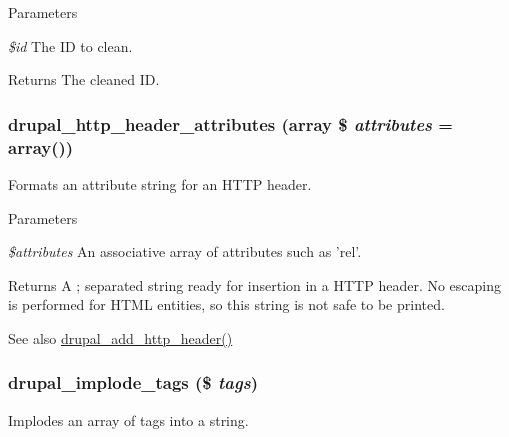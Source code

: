 \begin{DoxyParams}{Parameters}
\item[{\em \$id}]The ID to clean.\end{DoxyParams}
\begin{DoxyReturn}{Returns}
The cleaned ID. 
\end{DoxyReturn}
\hypertarget{common_8inc_a70f1ffdd840f920428c2a709f26125dc}{
\subsubsection[{drupal\_\-http\_\-header\_\-attributes}]{\setlength{\rightskip}{0pt plus 5cm}drupal\_\-http\_\-header\_\-attributes (array \$ {\em attributes} = {\ttfamily array()})}}
\label{common_8inc_a70f1ffdd840f920428c2a709f26125dc}
Formats an attribute string for an HTTP header.


\begin{DoxyParams}{Parameters}
\item[{\em \$attributes}]An associative array of attributes such as 'rel'.\end{DoxyParams}
\begin{DoxyReturn}{Returns}
A ; separated string ready for insertion in a HTTP header. No escaping is performed for HTML entities, so this string is not safe to be printed.
\end{DoxyReturn}
\begin{DoxySeeAlso}{See also}
\hyperlink{bootstrap_8inc_ad4ff2b2cf5a2fb632c2c869bc1a5a70f}{drupal\_\-add\_\-http\_\-header()} 
\end{DoxySeeAlso}
\hypertarget{common_8inc_a29df41fde25e9fcace627a628806c978}{
\subsubsection[{drupal\_\-implode\_\-tags}]{\setlength{\rightskip}{0pt plus 5cm}drupal\_\-implode\_\-tags (\$ {\em tags})}}
\label{common_8inc_a29df41fde25e9fcace627a628806c978}
Implodes an array of tags into a string.

